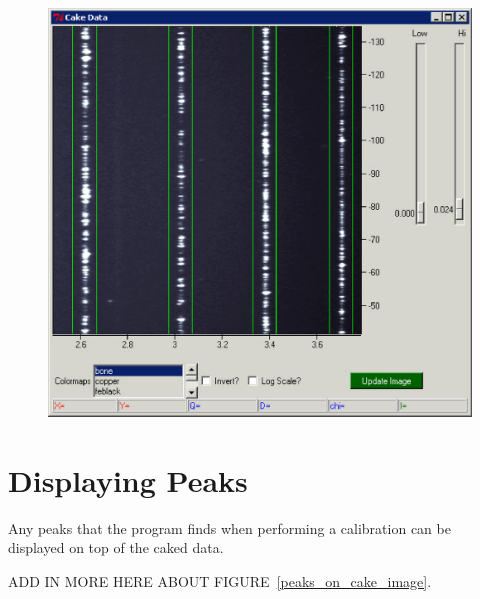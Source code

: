 \begin{figure}
    \centering
    \includegraphics[scale=.75]{figures/constant_dq_lines_on_cake_image.eps}
    \caption{}
    \label{constant_dq_lines_on_cake_image}
\end{figure}



\section{Displaying Peaks}

Any peaks that the program finds when performing
a calibration can be displayed on top of the caked
data. 

ADD IN MORE HERE ABOUT FIGURE~\ref{peaks_on_cake_image}.

